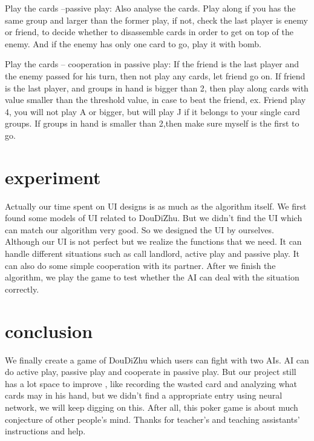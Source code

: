 \documentclass[a4paper,man,natbib]{apa6}
\begin{document}
Play the cards –passive play: Also analyse the cards. Play along if you has the same group and larger than the former play, if not, check the last player is enemy or friend, to decide whether to disassemble cards in order to get on top of the enemy. And if the enemy has only one card to go, play it with bomb.

Play the cards – cooperation in passive play: If the friend is the last player and the enemy passed for his turn, then not play any cards, let friend go on. If friend is the last player, and groups in hand is bigger than 2, then play along cards with value smaller than the threshold value, in case to beat the friend, ex. Friend play 4, you will not play A or bigger, but will play J if it belongs to your single card groups. If groups in hand is smaller than 2,then make sure myself is the first to go.



\section{experiment}
Actually our time spent on UI designs is as much as the algorithm itself. We first found some models of UI related to DouDiZhu. But we didn’t find the UI which can match our algorithm very good. So we designed the UI by ourselves. Although our UI is not perfect but we realize the functions that we need. It can handle different situations such as call landlord, active play and passive play. It can also do some simple cooperation with its partner. After we finish the algorithm, we play the game to test whether the AI can deal with the situation correctly.

\section{conclusion}
We finally create a game of DouDiZhu which users can fight with two AIs. AI can do active play, passive play and cooperate in passive play. But our project still has a lot space to improve , like recording the wasted card and analyzing what cards may in his hand, but we didn’t find a appropriate entry using neural network, we will keep digging on this. After all, this poker game is about much conjecture of other people’s mind. Thanks for teacher’s and teaching assistants’ instructions and help.
\end{document}
